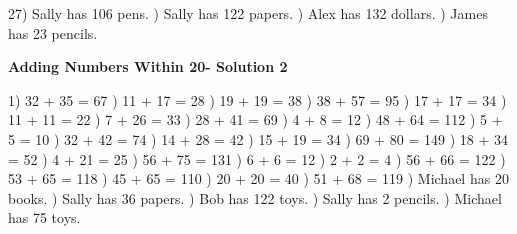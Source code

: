\documentclass{article}%
\begin{document}
27) Sally has 106 pens.%
) Sally has 122 papers.%
) Alex has 132 dollars.%
) James has 23 pencils.%
\newline%
\newpage%
\large%
\begin{center}%
\textbf{Adding Numbers Within 20- Solution 2}%
\newline%
\end{center} \normalsize%
1) 32 + 35 = 67%
) 11 + 17 = 28%
) 19 + 19 = 38%
) 38 + 57 = 95%
) 17 + 17 = 34%
) 11 + 11 = 22%
) 7 + 26 = 33%
) 28 + 41 = 69%
) 4 + 8 = 12%
) 48 + 64 = 112%
) 5 + 5 = 10%
) 32 + 42 = 74%
) 14 + 28 = 42%
) 15 + 19 = 34%
) 69 + 80 = 149%
) 18 + 34 = 52%
) 4 + 21 = 25%
) 56 + 75 = 131%
) 6 + 6 = 12%
) 2 + 2 = 4%
) 56 + 66 = 122%
) 53 + 65 = 118%
) 45 + 65 = 110%
) 20 + 20 = 40%
) 51 + 68 = 119%
) Michael has 20 books.%
) Sally has 36 papers.%
) Bob has 122 toys.%
) Sally has 2 pencils.%
) Michael has 75 toys.%
\newline%
\end{document}
